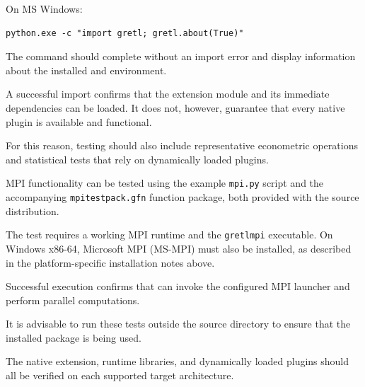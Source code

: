 On MS Windows:

\begin{verbatim}
python.exe -c "import gretl; gretl.about(True)"
\end{verbatim}

The command should complete without an import error
and display information about the installed
\gretlpy and \lgretl environment.

A successful import confirms that the extension
module and its immediate dependencies can be loaded.
It does not, however, guarantee that every native
\gretl plugin is available and functional.

For this reason, testing should also include
representative econometric operations and statistical
tests that rely on dynamically loaded \gretl plugins.

MPI functionality can be tested using the example
\texttt{mpi.py} script and the accompanying
\texttt{mpitestpack.gfn} function package, both provided
with the \gretlpy source distribution.

The test requires a working MPI runtime and the
\texttt{gretlmpi} executable. On Windows x86-64,
Microsoft MPI (MS-MPI) must also be installed,
as described in the platform-specific installation
notes above.

Successful execution confirms that \gretlpy can
invoke the configured MPI launcher and perform
parallel computations.

It is advisable to run these tests outside the \gretlpy source
directory to ensure that the installed package is being used.

The native extension, runtime libraries,
and dynamically loaded plugins should all be
verified on each supported target architecture.
